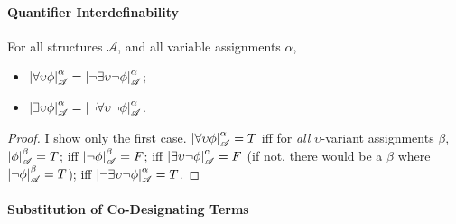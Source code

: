 \paragraph{Quantifier Interdefinability}

\begin{theorem}\label{qi}
For all structures $\mathscr{A}$, and all variable assignments $\alpha$, \begin{itemize}
	\item $\left|\forall\upsilon\phi\right|^{\alpha}_{\mathscr{A}}=\left|\neg\exists\upsilon\neg\phi\right|^{\alpha}_{\mathscr{A}}$;
	\item $\left|\exists\upsilon\phi\right|^{\alpha}_{\mathscr{A}}=\left|\neg\forall\upsilon\neg\phi\right|^{\alpha}_{\mathscr{A}}$.
\end{itemize} \begin{proof}
	{ I show only the first case. $\left|\forall\upsilon\phi\right|^{\alpha}_{\mathscr{A}}=T$ iff for \emph{all} $\upsilon$-variant assignments $\beta$, $\left|\phi\right|^{\beta}_{\mathscr{A}}=T$; iff $\left|\neg\phi\right|^{\beta}_{\mathscr{A}}=F$; iff $\left|\exists\upsilon\neg\phi\right|^{\alpha}_{\mathscr{A}}=F$ (if not, there would be a $\beta$ where $\left|\neg\phi\right|^{\beta}_{\mathscr{A}}=T$); iff $\left|\neg\exists\upsilon\neg\phi\right|^{\alpha}_{\mathscr{A}}=T$.}
\end{proof}	 
\end{theorem}

\paragraph{Substitution of Co-Designating Terms}\label{fivesubcod}

